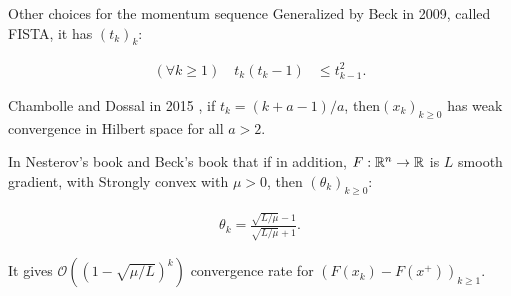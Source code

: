 \documentclass[11pt]{beamer}
\theoremstyle{definition}
\begin{document}
        \begin{frame}{Other choices for the momentum sequence}
            Generalized by Beck \cite{beck_fast_2009-1} in 2009, called FISTA, it has $(t_k)_{k}$: 
            \begin{tcolorbox}\noindent\vspace{-1em}
                \begin{align*}
                    (\forall k \ge 1)\quad t_k (t_k - 1) &\le t_{k - 1}^2. 
                \end{align*}    
            \end{tcolorbox}
            Chambolle and Dossal in 2015 \cite{chambolle_convergence_2015}, if $t_k = (k + a -1)/a$, then$(x_k)_{k \ge 0}$ has weak convergence in Hilbert space for all $a > 2$.
            \par  
            In Nesterov's book \cite{nesterov_lectures_2018} and Beck's book \cite{beck_first-order_2017} that if in addition, $F:\mathbb R^n \rightarrow \mathbb R$ is $L$ smooth gradient, with Strongly convex with $\mu > 0$, then $(\theta_k)_{k\ge 0}$: 
            \begin{tcolorbox}
                \begin{align*}
                   \theta_k = \frac{\sqrt{L/\mu} - 1}{\sqrt{L/\mu} + 1}. 
                \end{align*}
            \end{tcolorbox}
            It gives $\mathcal O((1 - \sqrt{\mu/L})^k)$ convergence rate for $(F(x_k) - F(x^+))_{k \ge 1}$. 
        \end{frame}
\end{document}
